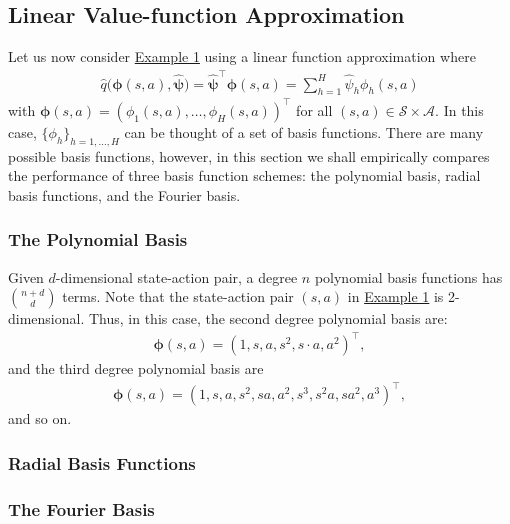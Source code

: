 

\subsection{Linear Value-function Approximation}
Let us now consider \hyperref[fig:toy graph]{Example 1} using a linear function approximation where
\begin{align}
    \hat{q}\big(\boldsymbol{\phi}(s,a), \widehat{\boldsymbol{\psi}}\big) = \widehat{\boldsymbol{\psi}}^\top \boldsymbol{\phi}(s,a)= \sum_{h=1}^H \hat{\psi}_h \phi_h(s,a) 
\end{align}
with $\boldsymbol{\phi}(s,a) = (\phi_1(s,a), \dots, \phi_H(s,a))^\top$ for all $(s,a) \in \mathcal{S}\times \mathcal{A}$. In this case, $\{\phi_h\}_{h=1, \dots, H}$ can be thought of a set of basis functions. There are many possible basis functions, however, in this section we shall empirically compares the performance of three basis function schemes: the polynomial basis, radial basis functions, and the Fourier basis.

\subsubsection{The Polynomial Basis}
Given $d$-dimensional state-action pair, a degree $n$ polynomial basis functions has $\binom{n+d}{d}$ terms. Note that the state-action pair $(s,a)$ in \hyperref[fig:toy graph]{Example 1} is 2-dimensional. Thus, in this case, the second degree polynomial basis are:
\begin{align}
    \boldsymbol{\phi}(s,a) = (1, s, a, s^2, s\cdot a, a^2)^\top,
\end{align}
and the third degree polynomial basis are
\begin{align}
    \boldsymbol{\phi}(s,a) = (1, s, a, s^2, sa, a^2, s^3, s^2a, sa^2, a^3)^\top,
\end{align}
and so on.
\subsubsection{Radial Basis Functions}


\subsubsection{The Fourier Basis}


